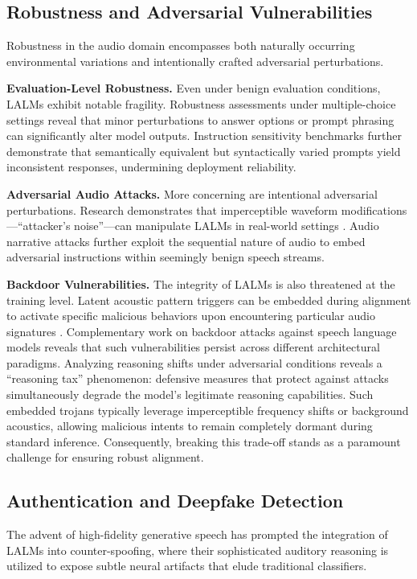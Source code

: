 \documentclass{llmxive}
\begin{document}
\subsection{Robustness and Adversarial Vulnerabilities}
Robustness in the audio domain encompasses both naturally occurring environmental variations and intentionally crafted adversarial perturbations.

\textbf{Evaluation-Level Robustness.} Even under benign evaluation conditions, LALMs exhibit notable fragility. Robustness assessments under multiple-choice settings \cite{lopez2025robustness} reveal that minor perturbations to answer options or prompt phrasing can significantly alter model outputs. Instruction sensitivity benchmarks \cite{li2025isa} further demonstrate that semantically equivalent but syntactically varied prompts yield inconsistent responses, undermining deployment reliability.

\textbf{Adversarial Audio Attacks.} More concerning are intentional adversarial perturbations. Research demonstrates that imperceptible waveform modifications---``attacker's noise''---can manipulate LALMs in real-world settings \cite{sadasivan2025attacker}. Audio narrative attacks \cite{yu2026now} further exploit the sequential nature of audio to embed adversarial instructions within seemingly benign speech streams.

\textbf{Backdoor Vulnerabilities.} The integrity of LALMs is also threatened at the training level. Latent acoustic pattern triggers can be embedded during alignment to activate specific malicious behaviors upon encountering particular audio signatures \cite{lin2025hidden}. Complementary work on backdoor attacks against speech language models \cite{fortier2025backdoor} reveals that such vulnerabilities persist across different architectural paradigms. Analyzing reasoning shifts under adversarial conditions \cite{nguyen2026analyzing} reveals a ``reasoning tax'' phenomenon: defensive measures that protect against attacks simultaneously degrade the model's legitimate reasoning capabilities. Such embedded trojans typically leverage imperceptible frequency shifts or background acoustics, allowing malicious intents to remain completely dormant during standard inference. Consequently, breaking this trade-off stands as a paramount challenge for ensuring robust alignment.


\subsection{Authentication and Deepfake Detection}
The advent of high-fidelity generative speech has prompted the integration of LALMs into counter-spoofing, where their sophisticated auditory reasoning is utilized to expose subtle neural artifacts that elude traditional classifiers.
\end{document}
